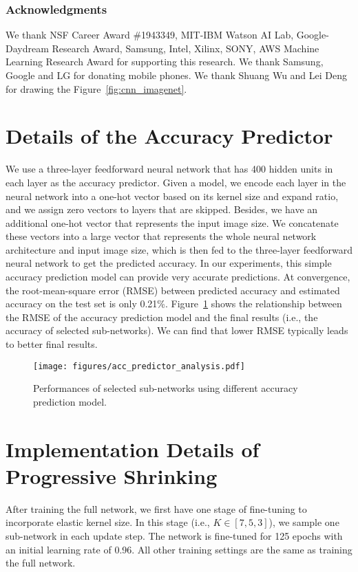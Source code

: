 \documentclass{article} \usepackage{iclr2020_conference,times}
\begin{document}
\subsubsection*{Acknowledgments}
We thank  NSF Career Award \#1943349, MIT-IBM Watson AI Lab, Google-Daydream Research Award, Samsung, Intel, Xilinx, SONY, AWS Machine Learning Research Award  for supporting this research. We thank Samsung, Google and LG for donating mobile phones. We thank Shuang Wu and Lei Deng for drawing the Figure~\ref{fig:cnn_imagenet}. 





\appendix
\section{Details of the Accuracy Predictor}\label{appendix:acc_predictor}
We use a three-layer feedforward neural network that has 400 hidden units in each layer as the accuracy predictor. Given a model, we encode each layer in the neural network into a one-hot vector based on its kernel size and expand ratio, and we assign zero vectors to layers that are skipped. Besides, we have an additional one-hot vector that represents the input image size. We concatenate these vectors into a large vector that represents the whole neural network architecture and input image size, which is then fed to the three-layer feedforward neural network to get the predicted accuracy. In our experiments, this simple accuracy prediction model can provide very accurate predictions. At convergence, the root-mean-square error (RMSE) between predicted accuracy and estimated accuracy on the test set is only 0.21\%. Figure~\ref{fig:acc_predictor_analysis} shows the relationship between the RMSE of the accuracy prediction model and the final results (i.e., the accuracy of selected sub-networks). We can find that lower RMSE typically leads to better final results. 

\begin{figure}[ht]
    \centering
    \texttt{[image: figures/acc\_predictor\_analysis.pdf]}
    \caption{Performances of selected sub-networks using different accuracy prediction model.}
    \label{fig:acc_predictor_analysis}
\end{figure}

\section{Implementation Details of Progressive Shrinking}\label{appendix:ps_details}
After training the full network, we first have one stage of fine-tuning to incorporate elastic kernel size. In this stage (i.e., $K \in [7, 5, 3]$), we sample one sub-network in each update step. The network is fine-tuned for 125 epochs with an initial learning rate of 0.96. All other training settings are the same as training the full network. 
\end{document}
